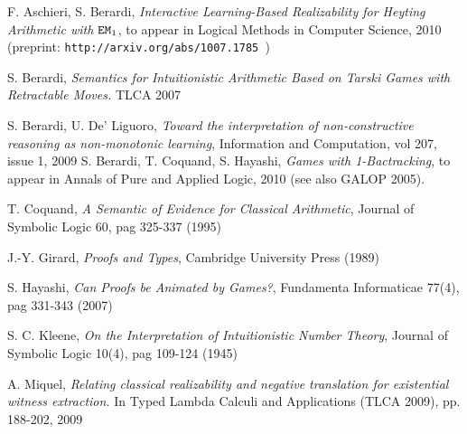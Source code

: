 \documentclass[copyright,creativecommons]{eptcs}
\newcommand{\EM}                       { {\tt EM} }
\newcommand{\comment}[1]{}
\begin{document}
\begin{thebibliography}{99}

\comment{\bibitem{Aschierifull} F.Aschieri, \emph{Interactive Learning Based Realizability and 1Backtracking Games}(Full Version), ( \texttt{http://www.di.unito.it/$\sim$aschieri/1Back.pdf })}
 F. Aschieri, S. Berardi,
\emph{Interactive Learning-Based Realizability for Heyting Arithmetic with $\EM_1$}, to appear in Logical Methods in Computer Science, 2010 (preprint: \texttt{http://arxiv.org/abs/1007.1785 })



 S. Berardi, \emph{Semantics for Intuitionistic Arithmetic Based on Tarski Games with Retractable Moves.} TLCA 2007

S. Berardi, U. De' Liguoro, \emph{Toward the interpretation of non-constructive reasoning as non-monotonic learning}, Information and Computation, vol 207, issue 1, 2009
S. Berardi, T. Coquand, S. Hayashi,
\emph{Games with 1-Bactracking}, to appear in Annals of Pure and Applied Logic, 2010
(see also GALOP 2005). 



T. Coquand,
\emph{A Semantic of Evidence for Classical Arithmetic},
Journal of Symbolic Logic 60, pag 325-337 (1995)


J.-Y. Girard,
\emph{Proofs and Types},
Cambridge University Press (1989)




S. Hayashi,
\emph{Can Proofs be Animated by Games?},
Fundamenta Informaticae 77(4), pag 331-343 (2007)


S. C. Kleene,
\emph{On the Interpretation of Intuitionistic Number Theory},
Journal of Symbolic Logic 10(4), pag 109-124 (1945)

 A. Miquel, \emph{Relating classical realizability and negative translation for existential witness extraction.} In Typed Lambda Calculi and Applications  (TLCA 2009), pp. 188-202, 2009


\end{thebibliography}
\end{document}
